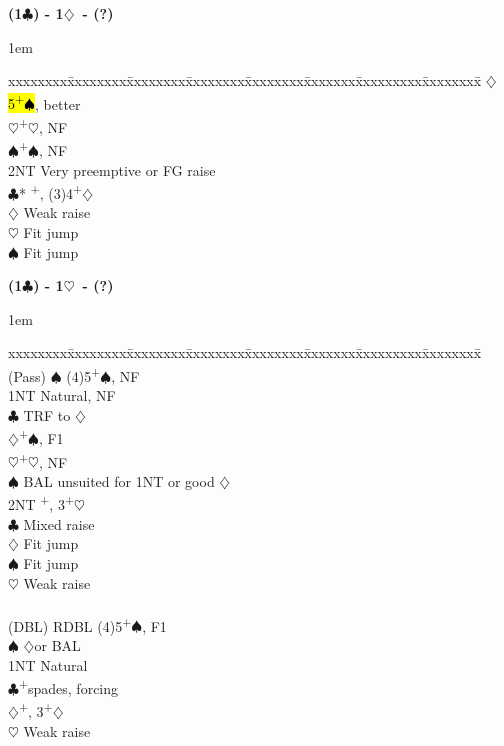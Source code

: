 \documentclass[10pt]{article}
\renewcommand{\c}{$\clubsuit$}
\renewcommand{\d}{$\diamondsuit$}
\newcommand{\h}{$\heartsuit$}
\newcommand{\s}{$\spadesuit$}
\newcommand{\p}{\textsuperscript{+}}
\newcommand{\x}{DBL}
\newcommand{\xx}{RDBL}
\newenvironment{bidtable}[1][]
{\textbf{#1}
  \begin{adjustwidth}{1em}{}
    \addvspace{2pt}
    \begin{tabbing}
      xxxxxxxx\=xxxxxxxx\=xxxxxxxx\=xxxxxxxx\=xxxxxxxx\=xxxxxxx\=xxxxxxxxx\=xxxxxxxx\=\kill}
{\end{tabbing}\end{adjustwidth}\bigskip}%
\begin{document}
\begin{bidtable}[(1\c) - 1\d\ - (?)]
       \d  \> \hl{5\p\s}, better          \\
       \h  {}\p\h, NF                   \\
       \s  {}\p\s, NF                   \\
       \> 2NT  \> Very preemptive or FG raise \\
       \c* {}\p, (3)4\p\d               \\
       \d  \> Weak raise                  \\
       \h  \> Fit jump                    \\
       \s  \> Fit jump
\end{bidtable}

\begin{bidtable}[(1\c) - 1\h\ - (?)]
(Pass) \s     \> (4)5\p\s, NF                             \\
       \> 1NT     \> Natural, NF                              \\
       \c     \> TRF to \d                                \\
       \d     {}\p\s, F1                                \\
       \h     {}\p\h, NF                                \\
       \s     \> BAL unsuited for 1NT or good \d          \\
       \> 2NT     \p, 3\p\h                               \\
       \c     \> Mixed raise                              \\
       \d     \> Fit jump                                 \\
       \s     \> Fit jump                                 \\
       \h     \> Weak raise                               \\
                                                              \\
(\x)   \> \xx     \> (4)5\p\s, F1                             \\
       \s     \> \d or BAL\\
       \> 1NT     \> Natural                                  \\
       \c     {}\p spades, forcing                       \\
       \d     {}\p, 3\p\d\\
       \h     \> Weak raise                               \\

\end{bidtable}
\end{document}
